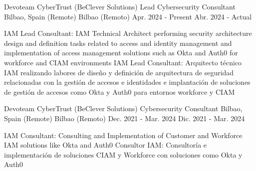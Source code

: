 	{}
	{}

\begin{cventries}
		
	\cventry
		{
			Devoteam CyberTrust (BeClever Solutions)
		} %
		{
			Lead Cybersecurity Consultant
		} %
		{
				{Bilbao, Spain (Remote)}
				{Bilbao  (Remoto)}
		} %
		{
				{Apr. 2024 - Present}
				{Abr. 2024 - Actual}
		} %
		{
			\begin{cvitems} %
				\item {
						{IAM Lead Consultant: IAM Technical Architect performing security architecture design and definition tasks related to access and identity management and implementation of access management solutions such as Okta and Auth0 for workforce and CIAM environments}
						{IAM Lead Consultant: Arquitecto técnico IAM realizando labores de diseño y definición de arquitectura de seguridad relacionadas con la gestión de accesos e identidades e implantación de soluciones de gestión de accesos como Okta y Auth0 para entornos workforce y CIAM}
					}
			\end{cvitems}
		}

	\cventry
		{
			Devoteam CyberTrust (BeClever Solutions)
		} %
		{
			Cybersecurity Consultant
		} %
		{
				{Bilbao, Spain (Remote)}
				{Bilbao  (Remoto)}
		} %
		{
				{Dec. 2021 - Mar. 2024}
				{Dic. 2021 - Mar. 2024}
		} %
		{
			\begin{cvitems} %
				\item {
						{IAM Consultant: Consulting and Implementation of Customer and Workforce IAM solutions like Okta and Auth0}
						{Consultor IAM: Consultoría e implementación de soluciones CIAM y Workforce con soluciones como Okta y Auth0}
					}
			\end{cvitems}
		}
		

\end{cventries}
